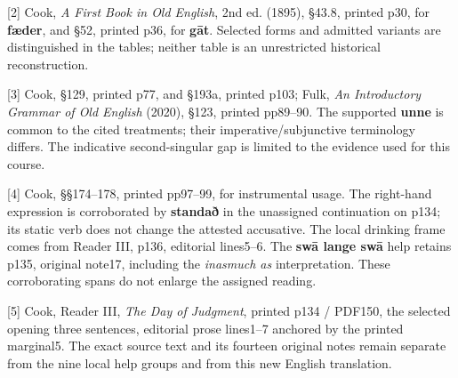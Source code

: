 [2] Cook, \emph{A First Book in Old English}, 2nd ed. (1895), §43.8, printed p30, for \textbf{fæder}, and §52, printed p36, for \textbf{gāt}. Selected forms and admitted variants are distinguished in the tables; neither table is an unrestricted historical reconstruction.

[3] Cook, §129, printed p77, and §193a, printed p103; Fulk, \emph{An Introductory Grammar of Old English} (2020), §123, printed pp89–90. The supported \textbf{unne} is common to the cited treatments; their imperative/\allowbreak{}subjunctive terminology differs. The indicative second-singular gap is limited to the evidence used for this course.

[4] Cook, §§174–178, printed pp97–99, for instrumental usage. The right-hand expression is corroborated by \textbf{standað} in the unassigned continuation on p134; its static verb does not change the attested accusative. The local drinking frame comes from Reader III, p136, editorial lines5–6. The \textbf{swā lange swā} help retains p135, original note17, including the \emph{inasmuch as} interpretation. These corroborating spans do not enlarge the assigned reading.

[5] Cook, Reader III, \emph{The Day of Judgment}, printed p134 /\allowbreak{} PDF150, the selected opening three sentences, editorial prose lines1–7 anchored by the printed marginal5. The exact source text and its fourteen original notes remain separate from the nine local help groups and from this new English translation.

\endgroup

\par\label{end-ch10-key}
\clearpage\endgroup
